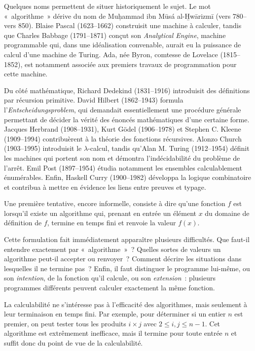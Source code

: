 \thingy Quelques noms permettent de situer historiquement le sujet.
Le mot « algorithme » dérive du nom de Muḥammad ibn Mūsá
al-\b{H}wārizmī (vers 780--vers 850).  Blaise Pascal
(1623--1662) construisit une machine à calculer, tandis que Charles
Babbage (1791--1871) conçut son \textit{Analytical Engine}, machine
programmable qui, dans une idéalisation convenable, aurait eu la
puissance de calcul d'une machine de Turing.  Ada, née Byron, comtesse
de Lovelace (1815--1852), est notamment associée aux premiers travaux
de programmation pour cette machine.

Du côté mathématique, Richard Dedekind (1831--1916) introduisit des
définitions par récursion primitive.  David Hilbert (1862--1943)
formula l'\textit{Entscheidungsproblem}, qui demandait essentiellement
une procédure générale permettant de décider la vérité des énoncés
mathématiques d'une certaine forme.  Jacques Herbrand (1908--1931),
Kurt Gödel (1906--1978) et Stephen C. Kleene (1909--1994)
contribuèrent à la théorie des fonctions récursives.  Alonzo Church
(1903--1995) introduisit le $\lambda$-calcul, tandis qu'Alan M. Turing
(1912--1954) définit les machines qui portent son nom et démontra
l'indécidabilité du problème de l'arrêt.  Emil Post (1897--1954)
étudia notamment les ensembles calculablement énumérables.  Enfin,
Haskell Curry (1900--1982) développa la logique combinatoire et
contribua à mettre en évidence les liens entre preuves et typage.

\thingy Une première tentative, encore informelle, consiste à dire
qu'une fonction $f$ est  lorsqu'il existe un
algorithme qui, prenant en entrée un élément $x$ du domaine de
définition de $f$, termine en temps fini et renvoie la valeur $f(x)$.

Cette formulation fait immédiatement apparaître plusieurs difficultés.
Que faut-il entendre exactement par « algorithme » ?  Quelles sortes
de valeurs un algorithme peut-il accepter ou renvoyer ?  Comment
décrire les situations dans lesquelles il ne termine pas ?  Enfin, il
faut distinguer le programme lui-même, ou son \emph{intention}, de la
fonction qu'il calcule, ou son \emph{extension} : plusieurs programmes
différents peuvent calculer exactement la même fonction.

\thingy La calculabilité ne s'intéresse pas à l'efficacité des
algorithmes, mais seulement à leur terminaison en temps fini.  Par
exemple, pour déterminer si un entier $n$ est premier, on peut tester
tous les produits $i\times j$ avec $2\leq i,j\leq n-1$.  Cet
algorithme est extrêmement inefficace, mais il termine pour toute
entrée $n$ et suffit donc du point de vue de la calculabilité.

